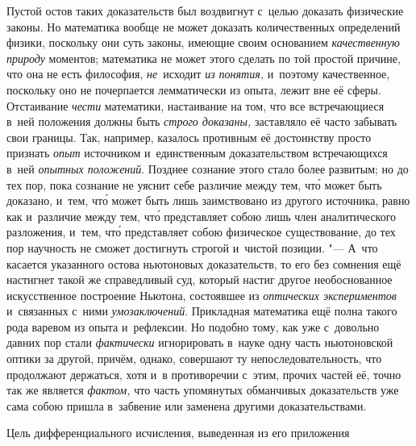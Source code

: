 Пустой остов таких доказательств был воздвигнут с~целью доказать физические
законы. Но математика вообще не может доказать количественных определений
физики, поскольку они суть законы, имеющие своим основанием {\em качественную
природу} моментов; математика не может этого сделать по той простой причине,
что она не есть философия, {\em не}~исходит {\em из понятия,} и~поэтому
качественное, поскольку оно не почерпается лемматически из опыта, лежит вне её
сферы. Отстаивание {\em чести} математики, настаивание на том, что все
встречающиеся в~ней положения должны быть {\em строго доказаны,} заставляло её
часто забывать свои границы. Так, например, казалось противным её достоинству
просто признать {\em опыт} источником и~единственным доказательством
встречающихся в~ней {\em опытных положений}. Позднее сознание этого
стало более развитым; но до тех пор, пока сознание не уяснит
себе различие между тем, чт\'{о} может быть доказано, и~тем, чт\'{о} может быть лишь
заимствовано из другого источника, равно как и~различие между тем, чт\'{о}
представляет собою лишь член аналитического разложения, и~тем, чт\'{о} представляет
собою физическое существование, до тех пор научность не сможет достигнуть
строгой и~чистой позиции. "--- А~что касается указанного остова ньютоновых
доказательств, то его без сомнения ещё настигнет такой же справедливый суд,
который настиг другое необоснованное искусственное построение Ньютона,
состоявшее из {\em оптических экспериментов} и~связанных с~ними
{\em умозаключений}. Прикладная математика ещё полна такого рода варевом из
опыта и~рефлексии. Но подобно тому, как уже с~довольно давних пор стали
{\em фактически} игнорировать в~науке одну часть ньютоновской оптики за другой,
причём, однако, совершают ту непоследовательность, что продолжают держаться,
хотя и~в противоречии с~этим, прочих частей её, точно так же является
{\em фактом,} что часть упомянутых обманчивых доказательств уже сама собою
пришла в~забвение или заменена другими доказательствами.

\subsubremark%
{Цель дифференциального исчисления, выведенная из его приложения}

